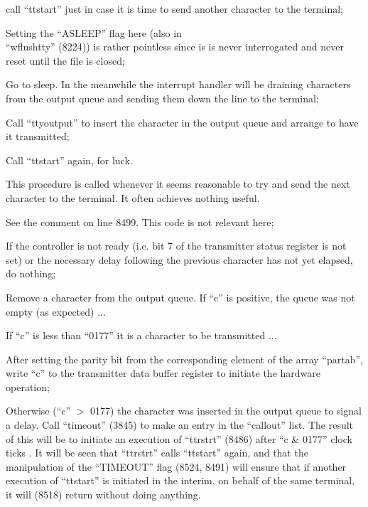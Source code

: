 \item[8561:] call ``ttstart'' just in case it is
time to send another character to
the terminal;

\item[8562:] Setting the ``ASLEEP'' flag here
(also in\\
``wflushtty'' (8224)) is
rather pointless since is is
never interrogated and never
reset until the file is closed;

\item[8563:] Go to sleep. In the meanwhile the
interrupt handler will be draining characters from the output
queue and sending them down the
line to the terminal;

\item[8566:] Call ``ttyoutput'' to insert the
character in the output queue and
arrange to have it transmitted;

\item[8568:] Call ``ttstart'' again, for luck.
\ed


This procedure is called whenever it
seems reasonable to try and send the
next character to the terminal. It
often achieves nothing useful.

\bd
\item[8514:] See the comment on line 8499.
This code is not relevant here;

\item[8518:] If the controller is not ready
(i.e. bit 7 of the transmitter
status register is not set) or
the necessary delay following the
previous character has not yet
elapsed, do nothing;

\item[8520:] Remove a character from the output queue. If ``c'' is positive,
the queue was not empty (as
expected) ...

\item[8521:] If ``c'' is less than ``0177'' it is
a character to be transmitted ...

\item[8522:] After setting the parity bit from
the corresponding element of the
array ``partab'', write ``c'' to the
transmitter data buffer register
to initiate the hardware operation;

\item[8524:] Otherwise (``c'' $>$ 0177)
the character was inserted in the output
queue to signal a delay. Call
``timeout'' (3845) to make an entry
in the ``callout'' list. The
result of this will be to initiate an execution of ``ttrstrt''
(8486) after ``c \& 0177'' clock
ticks . It will be seen that
``ttrstrt'' calls ``ttstart'' again,
and that the manipulation of the ``TIMEOUT''
flag (8524, 8491) will
ensure that if another execution
of ``ttstart'' is initiated in the
interim, on behalf of the same
terminal, it will (8518) return
without doing anything.
\ed

